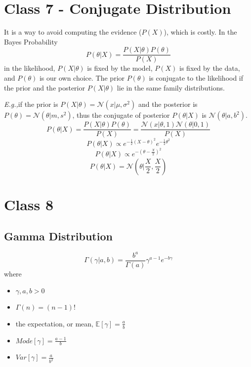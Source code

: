 \documentclass{article}
\newcommand{\Eg}{\textit{E.g.,}}
\begin{document}
\section{Class 7 - Conjugate Distribution}
It is a way to avoid computing the evidence ($P(X)$), which is costly. In the Bayes Probability
\begin{equation}
    P(\theta|X) = \frac{P(X|\theta)P(\theta)}{P(X)}
\end{equation}
in the likelihood, $P(X|\theta)$ is fixed by the model, $P(X)$ is fixed by the data, and $P(\theta)$ is our own choice. The prior $P(\theta)$ is conjugate to the likelihood if the prior and the posterior $P(X|\theta)$ lie in the same family distributions. 

\Eg if the prior is $P(X|\theta) = \mathcal{N}(x|\mu, \sigma^2)$ and the posterior is $P(\theta) = \mathcal{N}(\theta|m, s^2)$, thus the conjugate of posterior $P(\theta|X)$ is $\mathcal{N}(\theta|a, b^2)$.
\begin{equation}
    P(\theta|X) = \frac{P(X|\theta)P(\theta)}{P(X)} = \frac{\mathcal{N}(x|\theta, 1) \mathcal{N}(\theta|0, 1)}{P(X)}
\end{equation}
\begin{equation}
    P(\theta|X) \propto e^{-\frac{1}{2}(X - \theta)^2} e^{-\frac{1}{2}\theta^2}
\end{equation}
\begin{equation}
    P(\theta|X) \propto e^{-(\theta - \frac{X}{2})^2}
\end{equation}
\begin{equation}
    P(\theta|X) = \mathcal{N}(\theta|\frac{X}{2}, \frac{X}{2})
\end{equation}

\section{Class 8}

\subsection{Gamma Distribution}
\begin{equation}
    \Gamma(\gamma|a, b) = \frac{b^a}{\Gamma(a)} \gamma^{a-1}e^{-b\gamma}
\end{equation}
where \begin{itemize}
    \item $\gamma, a, b > 0$
    \item $\Gamma(n) = (n - 1)!$
    \item the expectation, or mean, $\mathbb{E}[\gamma] = \frac{a}{b}$
    \item $Mode[\gamma] = \frac{a-1}{b}$
    \item $Var[\gamma] = \frac{a}{b^2}$
\end{itemize}
\end{document}

